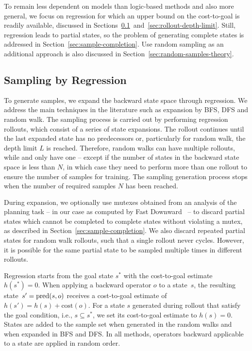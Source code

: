 To remain less dependent on models than logic-based methods and also more general, we focus on regression for which an upper bound on the cost-to-goal is readily available, discussed in Sections~\ref{sec:sampling-generation}~and~\ref{sec:rollout-depth-limit}. Still, regression leads to partial states, so the problem of generating complete states is addressed in Section~\ref{sec:sample-completion}. Use random sampling as an additional approach is also discussed in Section~\ref{sec:random-samples-theory}.

\subsection{Sampling by Regression}
\label{sec:sampling-generation}

To generate samples, we expand the backward state space through regression. We address the main techniques in the literature such as expansion by BFS, DFS and random walk. The sampling process is carried out by performing regression rollouts, which consist of a series of state expansions. The rollout continues until the last expanded state has no predecessors or, particularly for random walk, the depth limit $L$ is reached. Therefore, random walks can have multiple rollouts, while \bfs and \dfs only have one -- except if the number of states in the backward state space is less than $N$, in which case they need to perform more than one rollout to ensure the number of samples for training. The sampling generation process stops when the number of required samples $N$ has been reached.

During expansion, we optionally use mutexes obtained from an analysis of the planning task -- in our case as computed by Fast Downward~\cite{Helmert/2006} -- to discard partial states which cannot be completed to complete states without violating a mutex, as described in Section~\ref{sec:sample-completion}. We also discard repeated partial states for random walk rollouts, such that a single rollout never cycles. However, it is possible for the same partial state to be sampled multiple times in different rollouts.

Regression starts from the goal state $s^*$ with the cost-to-goal estimate~$h(s^*)=0$. When applying a backward operator $o$ to a state~$s$, the resulting state~$s' = \operatorname{pred}(s, o)$ receives a cost-to-goal estimate of $h(s') = h(s) + \text{cost}(o)$. For a state $s$ generated during rollout that satisfy the goal condition, i.e., $s \subseteq s^*$, we set its cost-to-goal estimate to $h(s) = 0$. States are added to the sample set when generated in the random walks and when expanded in BFS and DFS. In all methods, operators backward applicable to a state are applied in random order.

